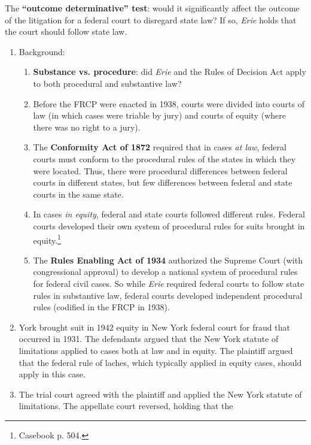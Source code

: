The \textbf{``outcome determinative'' test}: would it significantly 
affect the outcome of the litigation for a federal court to disregard state 
law? If so, \emph{Erie} holds that the court should follow state law.

\begin{enumerate}
    \item Background:
    \begin{enumerate}
        \item \textbf{Substance vs. procedure}: did \emph{Erie} and the Rules 
        of Decision Act apply to both procedural and substantive law?
        \item Before the FRCP were enacted in 1938, courts were divided into 
        courts of law (in which cases were triable by jury) and courts of 
        equity (where there was no right to a jury).
        \item The \textbf{Conformity Act of 1872} required that in cases 
        \emph{at law}, federal courts must conform to the procedural rules of 
        the states in which they were located. Thus, there were procedural 
        differences between federal courts in different states, but few 
        differences between federal and state courts in the same state.
        \item In cases \emph{in equity}, federal and state courts followed 
        different rules. Federal courts developed their own system of 
        procedural rules for suits brought in equity.\footnote{Casebook p.  
        504.}
        \item The \textbf{Rules Enabling Act of 1934} authorized the Supreme 
        Court (with congressional approval) to develop a national system of 
        procedural rules for federal civil cases. So while \emph{Erie} 
        required federal courts to follow state rules in substantive law, 
        federal courts developed independent procedural rules (codified in the 
        FRCP in 1938).
    \end{enumerate}
    \item York brought suit in 1942 equity in New York federal court for fraud 
    that occurred in 1931. The defendants argued that the New York statute of 
    limitations applied to cases both at law and in equity. The plaintiff 
    argued that the federal rule of laches, which typically applied in equity 
    cases, should apply in this case.
    \item The trial court agreed with the plaintiff and applied the New York 
    statute of limitations. The appellate court reversed, holding that the 

\end{enumerate}
